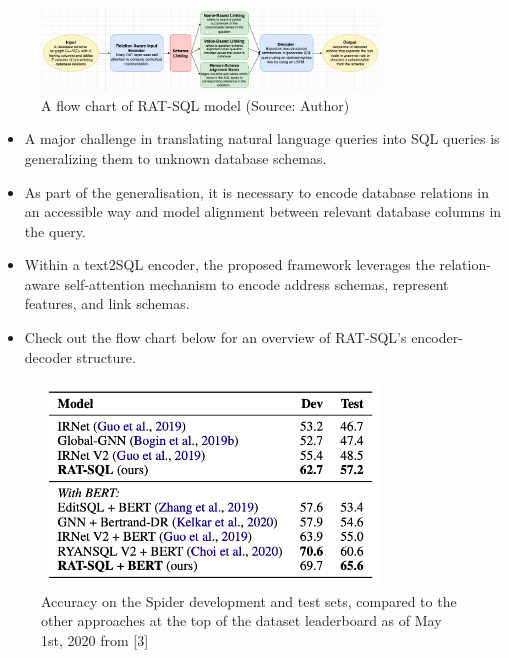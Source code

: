 
\begin{figure}[htb]
    \centering
    \includegraphics[width=0.8\textwidth]{pics/RAT-SQL/flow.png}
    \caption{A flow chart of RAT-SQL model (Source: Author)}
    \label{fig:RAT-SQL-flow}
\end{figure}

\begin{itemize}
    \item A major challenge in translating natural language queries into SQL queries is generalizing them to unknown database schemas.
    \item As part of the generalisation, it is necessary to encode database relations in an accessible way and model alignment between relevant database columns in the query.
    \item Within a text2SQL encoder, the proposed framework leverages the relation-aware self-attention mechanism to encode address schemas, represent features, and link schemas.
    \item Check out the flow chart below for an overview of RAT-SQL's encoder-decoder structure.
\end{itemize}

\begin{figure}[htb]
    \centering
    \includegraphics[width=0.8\textwidth]{pics/RAT-SQL/Accuracy.png}
    \caption{Accuracy on the Spider development and test sets, compared to the other approaches at the top of the dataset leaderboard as of May 1st, 2020 from [3]}
    \label{fig:RAT-SQL-Accuracy}
\end{figure}

